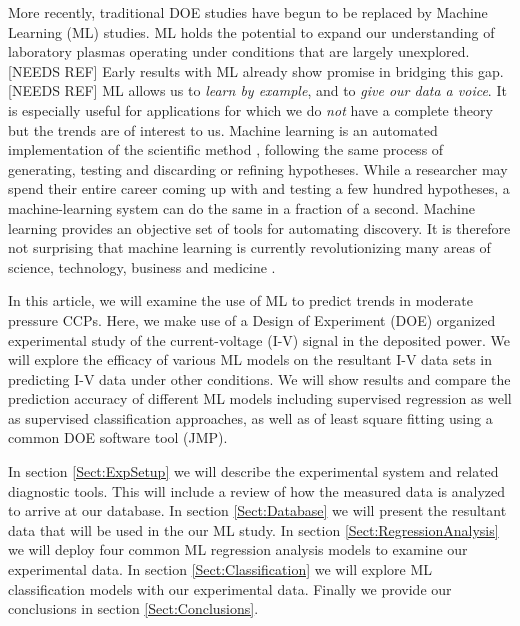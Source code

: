 \documentclass[12pt]{iopart}
\begin{document}
More recently, traditional DOE studies have begun to be replaced by Machine Learning (ML) studies.  ML holds the potential to expand our understanding of laboratory plasmas operating under conditions that are largely unexplored.[NEEDS REF]  Early results with ML already show promise in bridging this gap. [NEEDS REF] ML allows us to \textit{learn by example}, and to \textit{give our data a voice}. It is especially useful for applications for which we do \textit{not} have a complete theory but the trends are of interest to us. Machine learning is an automated implementation of the scientific method \cite{Domingos:2015}, following the same process of generating, testing and discarding or refining hypotheses. While a researcher may spend their entire career coming up with and testing a few hundred hypotheses, a machine-learning system can do the same in a fraction of a second. Machine learning provides an objective set of tools for automating discovery. It is therefore not surprising that machine learning is currently revolutionizing many areas of science, technology, business and medicine \cite{Lary:2016}.

In this article, we will examine the use of ML to predict trends in moderate pressure CCPs.  Here, we make use of a  Design of Experiment (DOE)  organized experimental study of the current-voltage (I-V) signal in the deposited power. We will explore the efficacy of various ML models on the resultant I-V data sets in predicting I-V data under other conditions. We will show results and compare the prediction accuracy of different ML models including supervised regression as well as supervised classification approaches, as well as of least square fitting using a common DOE software tool (JMP).

In section \ref{Sect:ExpSetup} we will describe the experimental system and related diagnostic tools.  This will include a review of how the measured data is analyzed to arrive at our database.  In section \ref{Sect:Database} we will present the resultant data that will be used in the our ML study. In section 
\ref{Sect:RegressionAnalysis} we will deploy four common ML regression analysis models to examine our experimental data.  In section \ref{Sect:Classification} we will explore ML classification models with our experimental data. Finally we provide our conclusions in section \ref{Sect:Conclusions}.
\end{document}
